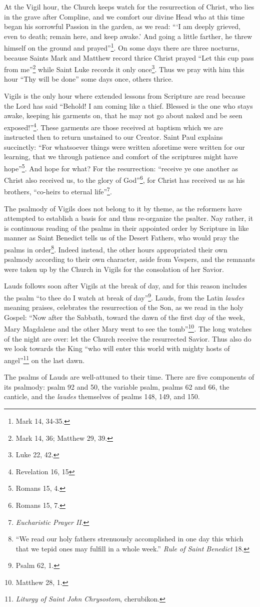 	At the Vigil hour, the Church keeps watch for the resurrection of Christ, who lies in the grave after Compline, and we comfort our divine Head who at this time began his sorrowful Passion in the garden, as we read: \enquote{\enquote{I am deeply grieved, even to death; remain here, and keep awake.} And going a little farther, he threw himself on the ground and prayed}\footnote{Mark 14, 34-35.}. On some days there are three nocturns, because Saints Mark and Matthew record thrice Christ prayed \enquote{Let this cup pass from me}\footnote{Mark 14, 36; Matthew 29, 39.} while Saint Luke records it only once\footnote{Luke 22, 42.}. Thus we pray with him this hour \enquote{Thy will be done} some days once, others thrice.
	
	Vigils is the only hour where extended lessons from Scripture are read because the Lord has said \enquote{Behold! I am coming like a thief. Blessed is the one who stays awake, keeping his garments on, that he may not go about naked and be seen exposed!}\footnote{Revelation 16, 15}. These garments are those received at baptism which we are instructed then to return unstained to our Creator. Saint Paul explains succinctly: \enquote{For whatsoever things were written aforetime were written for our learning, that we through patience and comfort of the scriptures might have hope}\footnote{Romans 15, 4.}. And hope for what? For the resurrection: \enquote{receive ye one another as Christ also received us, to the glory of God}\footnote{Romans 15, 7.}, for Christ has received us as his brothers, \enquote{co-heirs to eternal life}\footnote{\textit{Eucharistic Prayer II}.}.
	
	The psalmody of Vigils does not belong to it by theme, as the reformers have attempted to establish a basis for and thus re-organize the psalter. Nay rather, it is continuous reading of the psalms in their appointed order by Scripture in like manner as Saint Benedict tells us of the Desert Fathers, who would pray the psalms in order\footnote{\enquote{We read our holy fathers strenuously accomplished in one day this which that we tepid ones may fulfill in a whole week.} \textit{Rule of Saint Benedict} 18.}. Indeed instead, the other hours appropriated their own psalmody according to their own character, aside from Vespers, and the remnants were taken up by the Church in Vigils for the consolation of her Savior.
	
	Lauds follows soon after Vigils at the break of day, and for this reason includes the psalm \enquote{to thee do I watch at break of day}\footnote{Psalm 62, 1.}. Lauds, from the Latin \textit{laudes} meaning praises, celebrates the resurrection of the Son, as we read in the holy Gospel: \enquote{Now after the Sabbath, toward the dawn of the first day of the week, Mary Magdalene and the other Mary went to see the tomb}\footnote{Matthew 28, 1.}. The long watches of the night are over: let the Church receive the resurrected Savior. Thus also do we look towards the King \enquote{who will enter this world with mighty hosts of angel}\footnote{\textit{Liturgy of Saint John Chrysostom}, cherubikon.} on the last dawn.
	
	The psalms of Lauds are well-attuned to their time. There are five components of its psalmody: psalm 92 and 50, the variable psalm, psalms 62 and 66, the canticle, and the \textit{laudes} themselves of psalms 148, 149, and 150.
